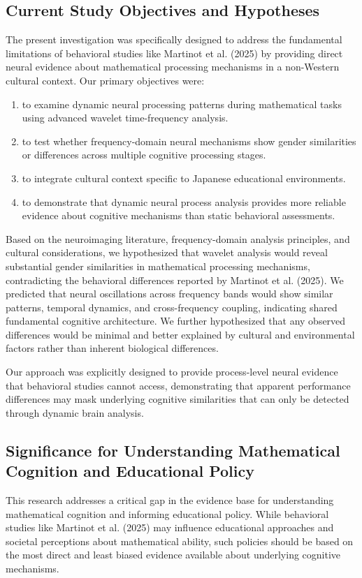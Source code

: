 \documentclass[pdflatex,reference]{sn-jnl}%
\theoremstyle{thmstyleone}%
\theoremstyle{thmstyletwo}%
\theoremstyle{thmstylethree}%
\begin{document}
\subsection{Current Study Objectives and Hypotheses}
The present investigation was specifically designed to address the fundamental limitations of behavioral studies like Martinot et al. (2025) by providing direct neural evidence about mathematical processing mechanisms in a non-Western cultural context. Our primary objectives were: 
\begin{enumerate}
\item to examine dynamic neural processing patterns during mathematical tasks using advanced wavelet time-frequency analysis.
\item to test whether frequency-domain neural mechanisms show gender similarities or differences across multiple cognitive processing stages.
\item to integrate cultural context specific to Japanese educational environments.
\item to demonstrate that dynamic neural process analysis provides more reliable evidence about cognitive mechanisms than static behavioral assessments.
\end{enumerate}

Based on the neuroimaging literature, frequency-domain analysis principles, and cultural considerations, we hypothesized that wavelet analysis would reveal substantial gender similarities in mathematical processing mechanisms, contradicting the behavioral differences reported by Martinot et al. (2025). We predicted that neural oscillations across frequency bands would show similar patterns, temporal dynamics, and cross-frequency coupling, indicating shared fundamental cognitive architecture. We further hypothesized that any observed differences would be minimal and better explained by cultural and environmental factors rather than inherent biological differences.

Our approach was explicitly designed to provide process-level neural evidence that behavioral studies cannot access, demonstrating that apparent performance differences may mask underlying cognitive similarities that can only be detected through dynamic brain analysis.


\subsection{Significance for Understanding Mathematical Cognition and Educational Policy}
This research addresses a critical gap in the evidence base for understanding mathematical cognition and informing educational policy. While behavioral studies like Martinot et al. (2025) may influence educational approaches and societal perceptions about mathematical ability, such policies should be based on the most direct and least biased evidence available about underlying cognitive mechanisms.
\end{document}
